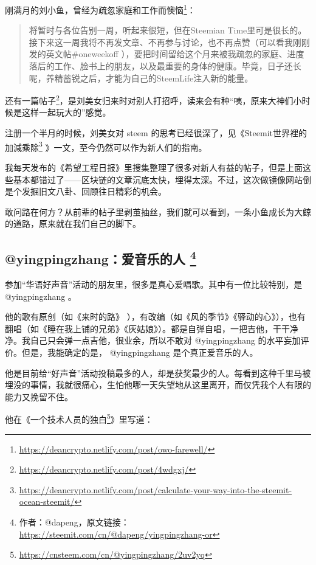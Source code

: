 \documentclass[]{ctexbook}
\renewcommand{\href}[2]{#2\footnote{\url{#1}}}
\begin{document}
刚满月的刘小鱼，曾经\href{https://deancrypto.netlify.com/post/owo-farewell/}{为疏忽家庭和工作而懊恼}：

\begin{quote}
将暂时与各位告别一周，听起来很短，但在Steemian Time里可是很长的。接下来这一周我将不再发文章、不再参与讨论，也不再点赞（可以看我刚刚发的英文帖\#oneweekoff ），要把时间留给这个月来被我疏忽的家庭、进度落后的工作、脸书上的朋友，以及最重要的身体的健康。毕竟，日子还长呢，养精蓄锐之后，才能为自己的SteemLife注入新的能量。
\end{quote}

还有\href{https://deancrypto.netlify.com/post/4wdgxj/}{一篇帖子}，是刘美女归来时对别人打招呼，读来会有种``咦，原来大神们小时候是这样一起玩大的''感觉。

注册一个半月的时候，刘美女对 steem 的思考已经很深了，见《\href{https://deancrypto.netlify.com/post/calculate-your-way-into-the-steemit-ocean-steemit/}{Steemit世界裡的加減乘除} 》一文，至今仍然可以作为新人们的指南。

我每天发布的《希望工程日报》里搜集整理了很多对新人有益的帖子，但是上面这些基本都错过了------区块链的文章沉底太快，埋得太深。不过，这次做镜像网站倒是个发掘旧文八卦、回顾往日精彩的机会。

敢问路在何方？从前辈的帖子里剥茧抽丝，我们就可以看到，一条小鱼成长为大鲸的道路，原来就在我们自己的脚下。

\hypertarget{yingpingzhang}{%
\subsection[@yingpingzhang：爱音乐的人 ]{\texorpdfstring{@yingpingzhang：爱音乐的人 \footnote{作者：@dapeng，原文链接：\url{https://steemit.com/cn/@dapeng/yingpingzhang-or}}}{@yingpingzhang：爱音乐的人 }}\label{yingpingzhang}}

参加``华语好声音''活动的朋友里，很多是真心爱唱歌。其中有一位比较特别，是 @yingpingzhang 。

他的歌有原创（如《来时的路》 ），有改编（如《风的季节》《驿动的心》），也有翻唱（如《睡在我上铺的兄弟》《灰姑娘》）。都是自弹自唱，一把吉他，干干净净。我自己只会弹一点吉他，很业余，所以不敢对 @yingpingzhang 的水平妄加评价。但是，我能确定的是， @yingpingzhang 是个真正爱音乐的人。

他是目前给``好声音''活动投稿最多的人，却是获奖最少的人。每看到这种千里马被埋没的事情，我就很痛心，生怕他哪一天失望地从这里离开，而仅凭我个人有限的能力又挽留不住。

他在《\href{https://cnsteem.com/cn/@yingpingzhang/2uv2yq}{一个技术人员的独白}》里写道：
\end{document}

